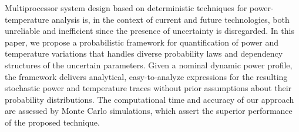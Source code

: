 Multiprocessor system design based on deterministic techniques for power-temperature analysis is, in the context of current and future technologies, both unreliable and inefficient since the presence of uncertainty is disregarded. In this paper, we propose a probabilistic framework for quantification of power and temperature variations that handles diverse probability laws and dependency structures of the uncertain parameters. Given a nominal dynamic power profile, the framework delivers analytical, easy-to-analyze expressions for the resulting stochastic power and temperature traces without prior assumptions about their probability distributions. The computational time and accuracy of our approach are assessed by Monte Carlo simulations, which assert the superior performance of the proposed technique.
